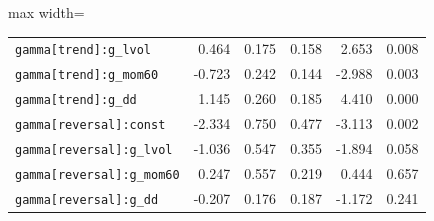 \begin{table}[!htbp]
\begin{adjustbox}{max width=\textwidth}
\begin{tabular}{lrrrrr}
\texttt{gamma[trend]:g\_lvol} & 0.464 & 0.175 & 0.158 & 2.653 & 0.008\\
\texttt{gamma[trend]:g\_mom60} & -0.723 & 0.242 & 0.144 & -2.988 & 0.003\\
\texttt{gamma[trend]:g\_dd} & 1.145 & 0.260 & 0.185 & 4.410 & 0.000\\
\texttt{gamma[reversal]:const} & -2.334 & 0.750 & 0.477 & -3.113 & 0.002\\
\texttt{gamma[reversal]:g\_lvol} & -1.036 & 0.547 & 0.355 & -1.894 & 0.058\\
\texttt{gamma[reversal]:g\_mom60} & 0.247 & 0.557 & 0.219 & 0.444 & 0.657\\
\texttt{gamma[reversal]:g\_dd} & -0.207 & 0.176 & 0.187 & -1.172 & 0.241\\
\bottomrule
\end{tabular}
\end{adjustbox}
\end{table}